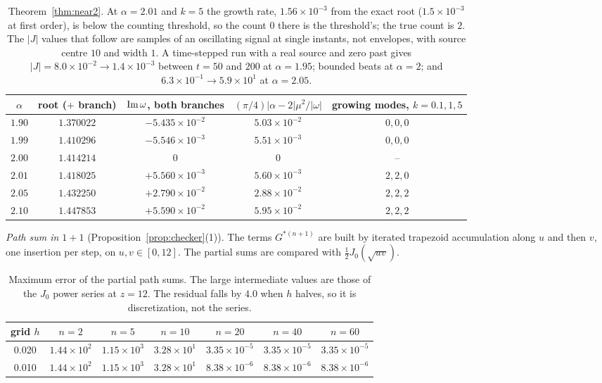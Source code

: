 \documentclass[11pt]{amsart}
\theoremstyle{definition}
\theoremstyle{remark}
\begin{document}
\begin{table}[h]
\centering\small
\begin{tabular}{ccccc}
\toprule
$\alpha$ & root ($+$ branch) & ${\rm Im}\,\omega$, both branches & $(\pi/4)\lvert\alpha-2\rvert\mu^2/\lvert\omega\rvert$ & growing modes, $k=0.1,1,5$\\
\midrule
$1.90$ & $1.370022$ & $-5.435\times10^{-2}$ & $5.03\times10^{-2}$ & $0,0,0$\\
$1.99$ & $1.410296$ & $-5.546\times10^{-3}$ & $5.51\times10^{-3}$ & $0,0,0$\\
$2.00$ & $1.414214$ & $0$ & $0$ & --\\
$2.01$ & $1.418025$ & $+5.560\times10^{-3}$ & $5.60\times10^{-3}$ & $2,2,0$\\
$2.05$ & $1.432250$ & $+2.790\times10^{-2}$ & $2.88\times10^{-2}$ & $2,2,2$\\
$2.10$ & $1.447853$ & $+5.590\times10^{-2}$ & $5.95\times10^{-2}$ & $2,2,2$\\
\bottomrule
\end{tabular}
\caption{Theorem~\ref{thm:near2}. At $\alpha=2.01$ and $k=5$ the growth rate, $1.56\times10^{-3}$ from the exact root ($1.5\times10^{-3}$ at first order), is below the counting threshold, so the count $0$ there is the threshold's; the true count is $2$. The $\lvert J\rvert$ values that follow are samples of an oscillating signal at single instants, not envelopes, with source centre $10$ and width $1$. A time-stepped run with a real source and zero past gives $\lvert J\rvert=8.0\times10^{-2}\to1.4\times10^{-3}$ between $t=50$ and $200$ at $\alpha=1.95$; bounded beats at $\alpha=2$; and $6.3\times10^{-1}\to5.9\times10^{1}$ at $\alpha=2.05$.}\label{tab:near2}
\end{table}

\emph{Path sum in $1+1$} (Proposition~\ref{prop:checker}(1)). The terms $G^{*(n+1)}$ are built by iterated trapezoid accumulation along $u$ and then $v$, one insertion per step, on $u,v\in[0,12]$. The partial sums are compared with $\tfrac12J_0(\sqrt{uv})$.

\begin{table}[h]
\centering
\begin{tabular}{ccccccc}
\toprule
grid $h$ & $n=2$ & $n=5$ & $n=10$ & $n=20$ & $n=40$ & $n=60$\\
\midrule
0.020 & $1.44\times10^{2}$ & $1.15\times10^{3}$ & $3.28\times10^{1}$ & $3.35\times10^{-5}$ & $3.35\times10^{-5}$ & $3.35\times10^{-5}$\\
0.010 & $1.44\times10^{2}$ & $1.15\times10^{3}$ & $3.28\times10^{1}$ & $8.38\times10^{-6}$ & $8.38\times10^{-6}$ & $8.38\times10^{-6}$\\
\bottomrule
\end{tabular}
\caption{Maximum error of the partial path sums. The large intermediate values are those of the $J_0$ power series at $z=12$. The residual falls by $4.0$ when $h$ halves, so it is discretization, not the series.}\label{tab:pathsum}
\end{table}
\end{document}
